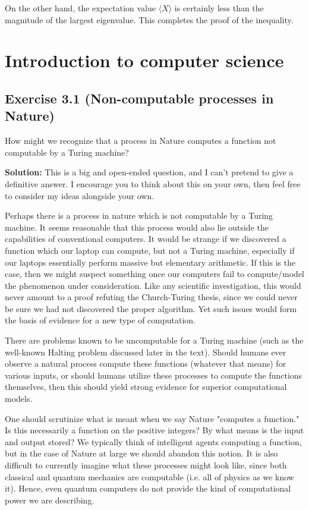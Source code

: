 \documentclass{book}
\begin{document}
    On the other hand, the expectation value $\langle X \rangle$ is certainly less than the magnitude of the largest eigenvalue. This completes the proof of the inequality.

\chapter{Introduction to computer science}

\section*{Exercise 3.1 (Non-computable processes in Nature)}
    How might we recognize that a process in Nature computes a function not computable by a Turing machine?

    \textbf{Solution:} This is a big and open-ended question, and I can't pretend to give a definitive answer. I encourage you to think about this on your own, then feel free to consider my ideas alongside your own.

    Perhaps there is a process in nature which is not computable by a Turing machine. It seems reasonable that this process would also lie outside the capabilities of conventional computers. It would be strange if we discovered a function which our laptop can compute, but not a Turing machine, especially if our laptops essentially perform massive but elementary arithmetic. If this is the case, then we might suspect something once our computers fail to compute/model the phenomenon under consideration. Like any scientific investigation, this would never amount to a proof refuting the Church-Turing thesis, since we could never be sure we had not discovered the proper algorithm. Yet such issues would form the basis of evidence for a new type of computation. 

    There are problems known to be uncomputable for a Turing machine (such as the well-known Halting problem discussed later in the text). Should humans ever observe a natural process compute these functions (whatever that means) for various inputs, or should humans utilize these processes to compute the functions themselves, then this should yield strong evidence for superior computational models.

    One should scrutinize what is meant when we say Nature "computes a function." Is this necessarily a function on the positive integers? By what means is the input and output stored? We typically think of intelligent agents computing a function, but in the case of Nature at large we should abandon this notion. It is also difficult to currently imagine what these processes might look like, since both classical and quantum mechanics are computable (i.e. all of physics as we know it). Hence, even quantum computers do not provide the kind of computational power we are describing. 
\end{document}
